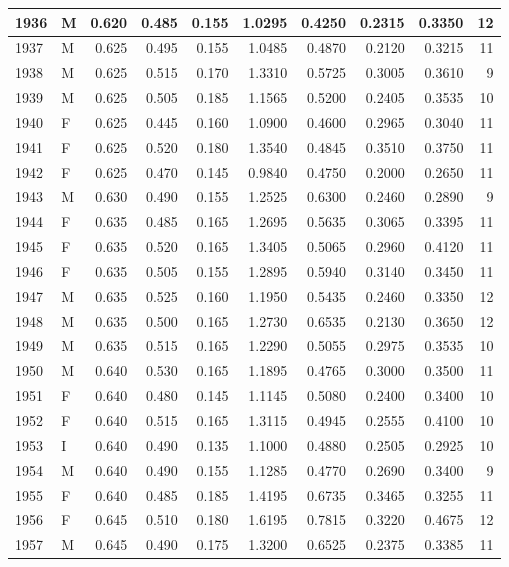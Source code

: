 \documentclass[9pt,twocolumn,twoside,]{pnas-new}
\begin{document}
\begin{tabular}{l|l|r|r|r|r|r|r|r|r}
\hline
1936 & M & 0.620 & 0.485 & 0.155 & 1.0295 & 0.4250 & 0.2315 & 0.3350 & 12\\
\hline
1937 & M & 0.625 & 0.495 & 0.155 & 1.0485 & 0.4870 & 0.2120 & 0.3215 & 11\\
\hline
1938 & M & 0.625 & 0.515 & 0.170 & 1.3310 & 0.5725 & 0.3005 & 0.3610 & 9\\
\hline
1939 & M & 0.625 & 0.505 & 0.185 & 1.1565 & 0.5200 & 0.2405 & 0.3535 & 10\\
\hline
1940 & F & 0.625 & 0.445 & 0.160 & 1.0900 & 0.4600 & 0.2965 & 0.3040 & 11\\
\hline
1941 & F & 0.625 & 0.520 & 0.180 & 1.3540 & 0.4845 & 0.3510 & 0.3750 & 11\\
\hline
1942 & F & 0.625 & 0.470 & 0.145 & 0.9840 & 0.4750 & 0.2000 & 0.2650 & 11\\
\hline
1943 & M & 0.630 & 0.490 & 0.155 & 1.2525 & 0.6300 & 0.2460 & 0.2890 & 9\\
\hline
1944 & F & 0.635 & 0.485 & 0.165 & 1.2695 & 0.5635 & 0.3065 & 0.3395 & 11\\
\hline
1945 & F & 0.635 & 0.520 & 0.165 & 1.3405 & 0.5065 & 0.2960 & 0.4120 & 11\\
\hline
1946 & F & 0.635 & 0.505 & 0.155 & 1.2895 & 0.5940 & 0.3140 & 0.3450 & 11\\
\hline
1947 & M & 0.635 & 0.525 & 0.160 & 1.1950 & 0.5435 & 0.2460 & 0.3350 & 12\\
\hline
1948 & M & 0.635 & 0.500 & 0.165 & 1.2730 & 0.6535 & 0.2130 & 0.3650 & 12\\
\hline
1949 & M & 0.635 & 0.515 & 0.165 & 1.2290 & 0.5055 & 0.2975 & 0.3535 & 10\\
\hline
1950 & M & 0.640 & 0.530 & 0.165 & 1.1895 & 0.4765 & 0.3000 & 0.3500 & 11\\
\hline
1951 & F & 0.640 & 0.480 & 0.145 & 1.1145 & 0.5080 & 0.2400 & 0.3400 & 10\\
\hline
1952 & F & 0.640 & 0.515 & 0.165 & 1.3115 & 0.4945 & 0.2555 & 0.4100 & 10\\
\hline
1953 & I & 0.640 & 0.490 & 0.135 & 1.1000 & 0.4880 & 0.2505 & 0.2925 & 10\\
\hline
1954 & M & 0.640 & 0.490 & 0.155 & 1.1285 & 0.4770 & 0.2690 & 0.3400 & 9\\
\hline
1955 & F & 0.640 & 0.485 & 0.185 & 1.4195 & 0.6735 & 0.3465 & 0.3255 & 11\\
\hline
1956 & F & 0.645 & 0.510 & 0.180 & 1.6195 & 0.7815 & 0.3220 & 0.4675 & 12\\
\hline
1957 & M & 0.645 & 0.490 & 0.175 & 1.3200 & 0.6525 & 0.2375 & 0.3385 & 11\\

\end{tabular}
\end{document}
